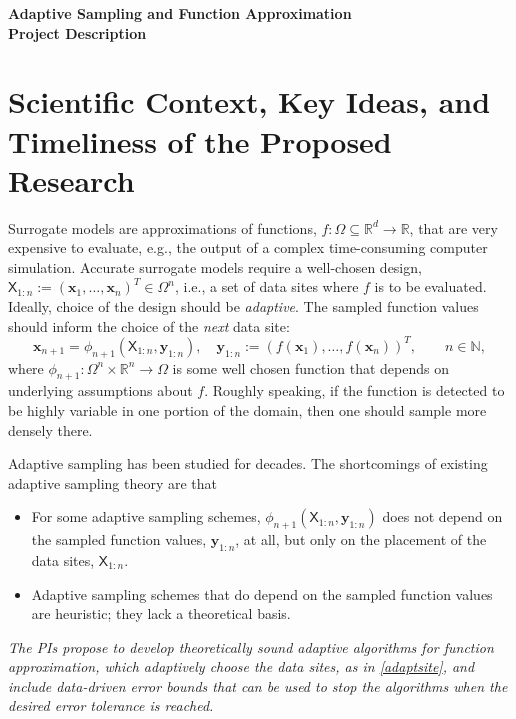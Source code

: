 \documentclass[11pt]{NSFamsart}
\newcommand{\reals}{{\mathbb{R}}}
\newcommand{\naturals}{{\mathbb{N}}}
\newcommand{\mX}{\mathsf{X}}
\newcommand{\bx}{{\boldsymbol{x}}}
\newcommand{\by}{{\boldsymbol{y}}}
\begin{document}

\begin{center}
\Large \textbf{Adaptive Sampling and Function Approximation \\ Project Description}
\end{center}
\vspace{-2ex}

\setcounter{tocdepth}{1}
\tableofcontents

\vspace{-6ex}

\section{Scientific Context, Key Ideas, and Timeliness of the Proposed Research}
Surrogate models are approximations of functions, $f: \Omega \subseteq \reals^d \to \reals$, that are very expensive to evaluate, e.g., the output of a complex time-consuming computer simulation.  Accurate surrogate models require a well-chosen design, $\mX_{1:n} := (\bx_1, \ldots, \bx_n)^T \in \Omega^{n}$, i.e., a set of data sites where $f$ is to be evaluated.  Ideally, choice of the design should be \emph{adaptive}. The sampled function values should inform the choice of the \emph{next} data site: 
\begin{equation} \label{adaptsite}
    \bx_{n+1} = \phi_{n+1}(\mX_{1:n},\by_{1:n}), \quad \by_{1:n} := (f(\bx_1), \ldots, f(\bx_n))^T, \qquad n \in \naturals,
\end{equation}
where $\phi_{n+1} : \Omega^{n} \times \reals^n \to \Omega$ is some well chosen function that depends on underlying assumptions about $f$.  Roughly speaking, if the function is detected to be highly variable in one portion of the domain, then one should sample more densely there. 

Adaptive sampling has been studied for decades.  The shortcomings of existing adaptive sampling theory are that
\begin{itemize}
    \item For some adaptive sampling schemes, $\phi_{n+1}(\mX_{1:n},\by_{1:n})$ does not depend on the sampled function values, $\by_{1:n}$, at all, but only on the placement of the data sites, $\mX_{1:n}$.
    
    \item Adaptive sampling schemes that do depend on the sampled function values are heuristic; they lack a theoretical basis.
\end{itemize}
\emph{The PIs propose to develop theoretically sound adaptive algorithms for function approximation, which adaptively choose the data sites, as in \eqref{adaptsite}, and include data-driven error bounds that can be used to stop the algorithms when the desired error tolerance is reached.}
\end{document}
